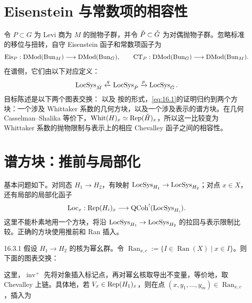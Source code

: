\section{Eisenstein 与常数项的相容性}\label{sec:16.2}
令 $P\subset G$ 为 Levi 商为 $M$ 的抛物子群，并令 $\check P\subset\check{G}$ 为对偶抛物子群。忽略标准的移位与扭转，自守 Eisenstein 函子和常数项函子为
\[\operatorname{Eis}_P:\operatorname{DMod}(\operatorname{Bun}_M)\longrightarrow\operatorname{DMod}(\operatorname{Bun}_G),\qquad
\operatorname{CT}_P:\operatorname{DMod}(\operatorname{Bun}_G)\longrightarrow\operatorname{DMod}(\operatorname{Bun}_M).\]
在谱侧，它们由以下对应定义：
\[\operatorname{LocSys}_{\check M}\xleftarrow{q}\operatorname{LocSys}_{\check P}\xrightarrow{p}\operatorname{LocSys}_{\check{G}}.\]
目标陈述是以下两个图表交换：
以及
按\cite{CCF24}的形式，\eqref{eq:16.1}的证明归约到两个方块：一个涉及 Whittaker 系数的几何方块，以及一个涉及表示的谱方块。在几何 Casselman–Shalika 等价下，$\operatorname{Whit}(H)_x\simeq\operatorname{Rep}(\check H)_x$，所以这一比较变为 Whittaker 系数的抛物限制与表示上的相应 Chevalley 函子之间的相容性。

\section{谱方块：推前与局部化}\label{sec:16.3}
基本问题如下。对同态 $H_1\to H_2$，有映射 $\operatorname{LocSys}_{H_1}\to\operatorname{LocSys}_{H_2}$；对点 $x\in X$，还有局部的局部化函子
\[\operatorname{Loc}_x:\operatorname{Rep}(H_i)_x\longrightarrow\operatorname{QCoh}^!(\operatorname{LocSys}_{H_i}).\]
这里不能朴素地用一个方块，将沿 $\operatorname{LocSys}_{H_1}\to\operatorname{LocSys}_{H_2}$ 的拉回与表示限制比较。正确的方块使用推前和 Ran 插入。
\begin{lemma}{}{16.3.1}
假设 $H_1\to H_2$ 的核为幂幺群。令 $\operatorname{Ran}_{x,c}:=\{I\in\operatorname{Ran}(X)\mid x\in I\}$。则下面的图表交换：
\end{lemma}

这里，$\operatorname{inv}^+$ 先将对象插入标记点，再对幂幺核取导出不变量，等价地，取 Chevalley 上链。具体地，若 $V_x\in\operatorname{Rep}(H_1)_x$，则在点 $(x,y_1,\ldots,y_m)\in\operatorname{Ran}_{x,c}$，插入为

